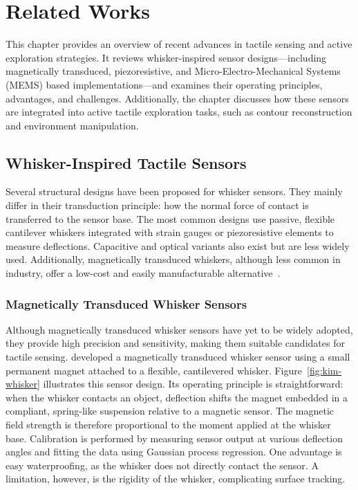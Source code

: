 

\chapter{Related Works}

This chapter provides an overview of recent advances in tactile sensing and active exploration strategies.
It reviews whisker-inspired sensor designs—including magnetically transduced, piezoresistive, and Micro-Electro-Mechanical Systems (MEMS) based implementations—and examines their operating principles, advantages, and challenges.
Additionally, the chapter discusses how these sensors are integrated into active tactile exploration tasks, such as contour reconstruction and environment manipulation.


\section{Whisker-Inspired Tactile Sensors}
Several structural designs have been proposed for whisker sensors.
They mainly differ in their transduction principle: how the normal force of contact is transferred to the sensor base.
The most common designs use passive, flexible cantilever whiskers integrated with strain gauges or piezoresistive elements to measure deflections.
Capacitive and optical variants also exist but are less widely used.
Additionally, magnetically transduced whiskers, although less common in industry, offer a low-cost and easily manufacturable alternative~\cite{8968518}.

\subsection{Magnetically Transduced Whisker Sensors}
Although magnetically transduced whisker sensors have yet to be widely adopted, they provide high precision and sensitivity, making them suitable candidates for tactile sensing.
\textcite{8968518} developed a magnetically transduced whisker sensor using a small permanent magnet attached to a flexible, cantilevered whisker.
Figure~\ref{fig:kim-whisker} illustrates this sensor design.
Its operating principle is straightforward: when the whisker contacts an object, deflection shifts the magnet embedded in a compliant, spring-like suspension relative to a magnetic sensor.
The magnetic field strength is therefore proportional to the moment applied at the whisker base.
Calibration is performed by measuring sensor output at various deflection angles and fitting the data using Gaussian process regression.
One advantage is easy waterproofing, as the whisker does not directly contact the sensor.
A limitation, however, is the rigidity of the whisker, complicating surface tracking.


